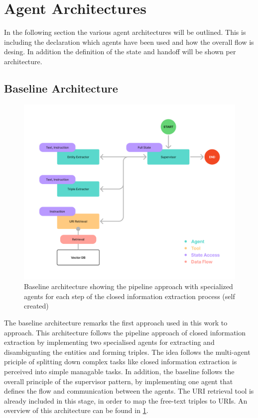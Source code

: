 \documentclass[a4paper,oneside,bibliography=totoc]{scrbook}
\begin{document}
\section{Agent Architectures}
\label{sec:agent_architectures}

In the following section the various agent architectures will be outlined. This is including the declaration which agents have been used and how the overall flow is desing. In addition the definition of the state and handoff will be shown per architecture.

\subsection{Baseline Architecture}
\label{subsec:baseline}

\begin{figure}[h]
  \centering
  \includegraphics[width=\textwidth]{figures/Baseline Architecture.png}
  \caption[Baseline architecture showing the pipeline approach with specialized agents for each step of the closed information extraction process]{Baseline architecture showing the pipeline approach with specialized agents for each step of the closed information extraction process (self created)}
  \label{fig:baseline_architecture}
\end{figure}

The baseline architecture remarks the first approach used in this work to approach. This architecture follows the pipeline approach of closed information extraction by implementing two specialised agents for extracting and disambiguating the entities and forming triples. The idea follows the multi-agent priciple of splitting down complex tasks like closed information extraction is perceived \cite{Josifoski2021} into simple managable tasks. In addition, the baseline follows the overall principle of the supervisor pattern, by implementing one agent that defines the flow and communication between the agents. The URI retrieval tool is already included in this stage, in order to map the free-text triples to URIs. An overview of this architecture can be found in \ref{fig:baseline_architecture}.
\end{document}

